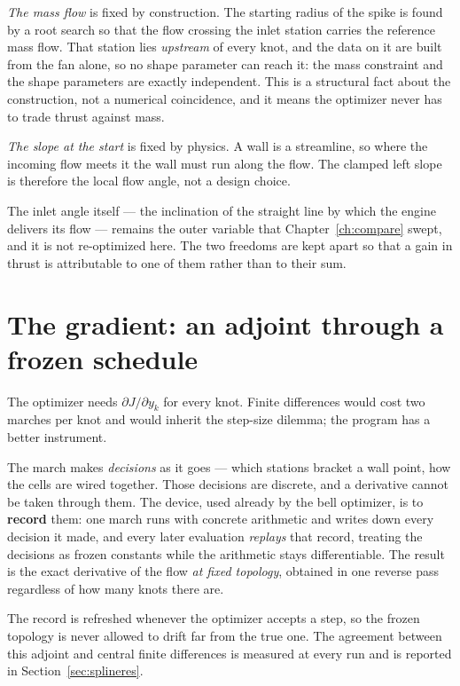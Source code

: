 \emph{The mass flow} is fixed by construction. The starting radius of
the spike is found by a root search so that the flow crossing the
inlet station carries the reference mass flow. That station lies
\emph{upstream} of every knot, and the data on it are built from the
fan alone, so no shape parameter can reach it: the mass constraint and
the shape parameters are exactly independent. This is a structural
fact about the construction, not a numerical coincidence, and it means
the optimizer never has to trade thrust against mass.

\emph{The slope at the start} is fixed by physics. A wall is a
streamline, so where the incoming flow meets it the wall must run
along the flow. The clamped left slope is therefore the local flow
angle, not a design choice.

The inlet angle itself --- the inclination of the straight line by
which the engine delivers its flow --- remains the outer variable that
Chapter~\ref{ch:compare} swept, and it is not re-optimized here. The
two freedoms are kept apart so that a gain in thrust is attributable
to one of them rather than to their sum.

\section{The gradient: an adjoint through a frozen schedule}

The optimizer needs $\partial J/\partial y_k$ for every knot. Finite
differences would cost two marches per knot and would inherit the
step-size dilemma; the program has a better instrument.

The march makes \emph{decisions} as it goes --- which stations bracket
a wall point, how the cells are wired together. Those decisions are
discrete, and a derivative cannot be taken through them. The device,
used already by the bell optimizer, is to \textbf{record} them: one
march runs with concrete arithmetic and writes down every decision it
made, and every later evaluation \emph{replays} that record, treating
the decisions as frozen constants while the arithmetic stays
differentiable. The result is the exact derivative of the flow
\emph{at fixed topology}, obtained in one reverse pass regardless of
how many knots there are.

The record is refreshed whenever the optimizer accepts a step, so the
frozen topology is never allowed to drift far from the true one. The
agreement between this adjoint and central finite differences is
measured at every run and is reported in Section~\ref{sec:splineres}.

